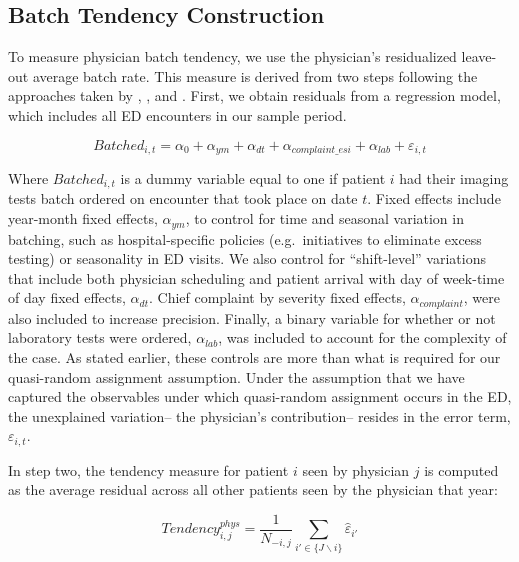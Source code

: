 \documentclass[,,nonblindrev]{informs}
\begin{document}
\hypertarget{batch-tendency-construction}{%
\subsection{Batch Tendency
Construction}\label{batch-tendency-construction}}

To measure physician batch tendency, we use the physician's residualized
leave-out average batch rate. This measure is derived from two steps
following the approaches taken by \citet{doyle2015measuring},
\citet{dobbie2018effects}, and \citet{eichmeyer2022pathways}. First, we
obtain residuals from a regression model, which includes all ED
encounters in our sample period.

\begin{equation}
Batched_{i,t} = \alpha_0 + \alpha_{ym} + \alpha_{dt} + \alpha_{complaint\_esi} + \alpha_{lab} + \varepsilon_{i,t}
\end{equation}

Where \(Batched_{i,t}\) is a dummy variable equal to one if patient
\(i\) had their imaging tests batch ordered on encounter that took place
on date \(t\). Fixed effects include year-month fixed effects,
\(\alpha_{ym}\), to control for time and seasonal variation in batching,
such as hospital-specific policies (e.g.~initiatives to eliminate excess
testing) or seasonality in ED visits. We also control for
``shift-level'' variations that include both physician scheduling and
patient arrival with day of week-time of day fixed effects,
\(\alpha_{dt}\). Chief complaint by severity fixed effects,
\(\alpha_{complaint}\), were also included to increase precision.
Finally, a binary variable for whether or not laboratory tests were
ordered, \(\alpha_{lab}\), was included to account for the complexity of
the case. As stated earlier, these controls are more than what is
required for our quasi-random assignment assumption. Under the
assumption that we have captured the observables under which
quasi-random assignment occurs in the ED, the unexplained variation--
the physician's contribution-- resides in the error term,
\(\varepsilon_{i,t}\).

In step two, the tendency measure for patient \(i\) seen by physician
\(j\) is computed as the average residual across all other patients seen
by the physician that year:

\begin{equation}
Tendency_{i,j}^{phys} =
\frac{1}{N_{-i,j}} \sum_{i' \in \{J \backslash i\}}\hat{\varepsilon}_{i'}
\end{equation}
\end{document}

